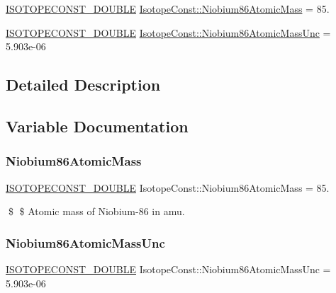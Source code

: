 \begin{DoxyCompactItemize}
\item 
\mbox{\hyperlink{group___isotope_const-_macros_ga8f45a7272ce02c0b4c65c44636ed719a}{I\+S\+O\+T\+O\+P\+E\+C\+O\+N\+S\+T\+\_\+\+D\+O\+U\+B\+LE}} \mbox{\hyperlink{group___isotope_const-_niobium-_nb86_ga76b954250dd8c2aa450e4dc201414fea}{Isotope\+Const\+::\+Niobium86\+Atomic\+Mass}} = 85.
\item 
\mbox{\hyperlink{group___isotope_const-_macros_ga8f45a7272ce02c0b4c65c44636ed719a}{I\+S\+O\+T\+O\+P\+E\+C\+O\+N\+S\+T\+\_\+\+D\+O\+U\+B\+LE}} \mbox{\hyperlink{group___isotope_const-_niobium-_nb86_ga5ef926e818163d1f46d411173b9a2834}{Isotope\+Const\+::\+Niobium86\+Atomic\+Mass\+Unc}} = 5.\+903e-\/06
\end{DoxyCompactItemize}


\subsection{Detailed Description}


\subsection{Variable Documentation}
\mbox{\label{group___isotope_const-_niobium-_nb86_ga76b954250dd8c2aa450e4dc201414fea}} 
\subsubsection{\texorpdfstring{Niobium86\+Atomic\+Mass}{Niobium86AtomicMass}}
{\footnotesize\ttfamily \mbox{\hyperlink{group___isotope_const-_macros_ga8f45a7272ce02c0b4c65c44636ed719a}{I\+S\+O\+T\+O\+P\+E\+C\+O\+N\+S\+T\+\_\+\+D\+O\+U\+B\+LE}} Isotope\+Const\+::\+Niobium86\+Atomic\+Mass = 85.}

\$ \$ Atomic mass of Niobium-\/86 in amu. \mbox{\label{group___isotope_const-_niobium-_nb86_ga5ef926e818163d1f46d411173b9a2834}} 
\subsubsection{\texorpdfstring{Niobium86\+Atomic\+Mass\+Unc}{Niobium86AtomicMassUnc}}
{\footnotesize\ttfamily \mbox{\hyperlink{group___isotope_const-_macros_ga8f45a7272ce02c0b4c65c44636ed719a}{I\+S\+O\+T\+O\+P\+E\+C\+O\+N\+S\+T\+\_\+\+D\+O\+U\+B\+LE}} Isotope\+Const\+::\+Niobium86\+Atomic\+Mass\+Unc = 5.\+903e-\/06}

